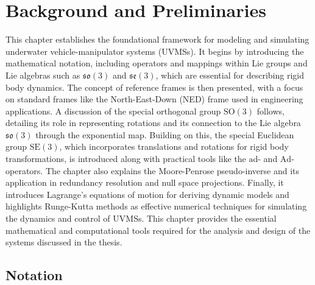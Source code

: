 \chapter{Background and {Preliminaries}}

This chapter establishes the foundational framework for modeling and
simulating underwater vehicle-manipulator systems (UVMSs). It begins by
introducing the mathematical notation, including operators and mappings within
Lie groups and Lie algebras such as \(\mathfrak{so}(3)\) and \(\mathfrak{se}(
3)\), which are essential for describing rigid body dynamics. The concept of
reference frames is then presented, with a focus on standard frames like the
North-East-Down (NED) frame used in engineering applications. A
discussion of the special orthogonal group \(\text{SO}(3)\) follows, detailing
its role in representing rotations and its connection to the Lie algebra \(
\mathfrak{so}(3)\) through the exponential map. Building on this, the special
Euclidean group \(\text{SE}(3)\), which incorporates translations and
rotations for rigid body transformations, is introduced along with practical
tools like the \(\text{ad}\)- and \(\text{Ad}\)-operators. The chapter also
explains the Moore-Penrose pseudo-inverse and its application in redundancy
resolution and null space projections. Finally, it introduces Lagrange's
equations of motion for deriving dynamic models and highlights Runge-Kutta
methods as effective numerical techniques for simulating the dynamics and
control of UVMSs. This chapter provides the essential mathematical and
computational tools required for the analysis and design of the systems
discussed in the thesis.

\section{Notation}
\label{sec:bp:notation}

